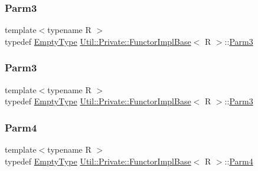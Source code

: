 \mbox{\label{structUtil_1_1Private_1_1FunctorImplBase_a052148e627fd4caecbcffdbdf1033dbb}} 
\subsubsection{\texorpdfstring{Parm3}{Parm3}\hspace{0.1cm}{\footnotesize\ttfamily [2/3]}}
{\footnotesize\ttfamily template$<$typename R $>$ \\
typedef \mbox{\hyperlink{classUtil_1_1EmptyType}{Empty\+Type}} \mbox{\hyperlink{structUtil_1_1Private_1_1FunctorImplBase}{Util\+::\+Private\+::\+Functor\+Impl\+Base}}$<$ R $>$\+::\mbox{\hyperlink{structUtil_1_1Private_1_1FunctorImplBase_a052148e627fd4caecbcffdbdf1033dbb}{Parm3}}}

\mbox{\label{structUtil_1_1Private_1_1FunctorImplBase_a052148e627fd4caecbcffdbdf1033dbb}} 
\subsubsection{\texorpdfstring{Parm3}{Parm3}\hspace{0.1cm}{\footnotesize\ttfamily [3/3]}}
{\footnotesize\ttfamily template$<$typename R $>$ \\
typedef \mbox{\hyperlink{classUtil_1_1EmptyType}{Empty\+Type}} \mbox{\hyperlink{structUtil_1_1Private_1_1FunctorImplBase}{Util\+::\+Private\+::\+Functor\+Impl\+Base}}$<$ R $>$\+::\mbox{\hyperlink{structUtil_1_1Private_1_1FunctorImplBase_a052148e627fd4caecbcffdbdf1033dbb}{Parm3}}}

\mbox{\label{structUtil_1_1Private_1_1FunctorImplBase_a1ad7fe3f243480c44a610927ebe76762}} 
\subsubsection{\texorpdfstring{Parm4}{Parm4}\hspace{0.1cm}{\footnotesize\ttfamily [1/3]}}
{\footnotesize\ttfamily template$<$typename R $>$ \\
typedef \mbox{\hyperlink{classUtil_1_1EmptyType}{Empty\+Type}} \mbox{\hyperlink{structUtil_1_1Private_1_1FunctorImplBase}{Util\+::\+Private\+::\+Functor\+Impl\+Base}}$<$ R $>$\+::\mbox{\hyperlink{structUtil_1_1Private_1_1FunctorImplBase_a1ad7fe3f243480c44a610927ebe76762}{Parm4}}}

